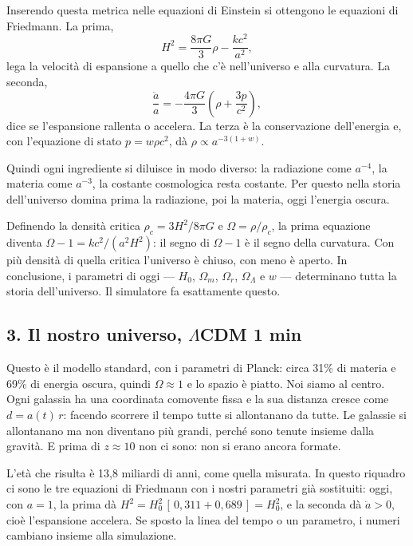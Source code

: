 Inserendo questa metrica nelle equazioni di Einstein si ottengono le equazioni di Friedmann. La prima,
\[
  H^2 = \frac{8\pi G}{3}\rho - \frac{kc^2}{a^2},
\]
lega la velocità di espansione a quello che c'è nell'universo e alla curvatura. La seconda,
\[
  \frac{\ddot a}{a} = -\frac{4\pi G}{3}\left(\rho + \frac{3p}{c^2}\right),
\]
dice se l'espansione rallenta o accelera. La terza è la conservazione dell'energia e, con l'equazione di stato $p = w\rho c^2$, dà $\rho \propto a^{-3(1+w)}$.

Quindi ogni ingrediente si diluisce in modo diverso: la radiazione come $a^{-4}$, la materia come $a^{-3}$, la costante cosmologica resta costante. Per questo nella storia dell'universo domina prima la radiazione, poi la materia, oggi l'energia oscura.

Definendo la densità critica $\rho_c = 3H^2/8\pi G$ e $\Omega = \rho/\rho_c$, la prima equazione diventa $\Omega - 1 = kc^2/(a^2H^2)$: il segno di $\Omega - 1$ è il segno della curvatura. Con più densità di quella critica l'universo è chiuso, con meno è aperto.
In conclusione, i parametri di oggi --- $H_0$, $\Omega_m$, $\Omega_r$, $\Omega_\Lambda$ e $w$ --- determinano tutta la storia dell'universo. Il simulatore fa esattamente questo.

\subsection*{3. Il nostro universo, \texorpdfstring{$\Lambda$}{Lambda}CDM \hfill\normalfont\small 1 min}
Questo è il modello standard, con i parametri di Planck: circa 31\% di materia e 69\% di energia oscura, quindi $\Omega \approx 1$ e lo spazio è piatto.
Noi siamo al centro. Ogni galassia ha una coordinata comovente fissa e la sua distanza cresce come $d = a(t)\,r$: facendo scorrere il tempo tutte si allontanano da tutte.
Le galassie si allontanano ma non diventano più grandi, perché sono tenute insieme dalla gravità. E prima di $z \approx 10$ non ci sono: non si erano ancora formate.

L'età che risulta è 13,8 miliardi di anni, come quella misurata.
In questo riquadro ci sono le tre equazioni di Friedmann con i nostri parametri già sostituiti: oggi, con $a = 1$, la prima dà $H^2 = H_0^2\,[\,0{,}311 + 0{,}689\,] = H_0^2$, e la seconda dà $\ddot a > 0$, cioè l'espansione accelera. Se sposto la linea del tempo o un parametro, i numeri cambiano insieme alla simulazione.

